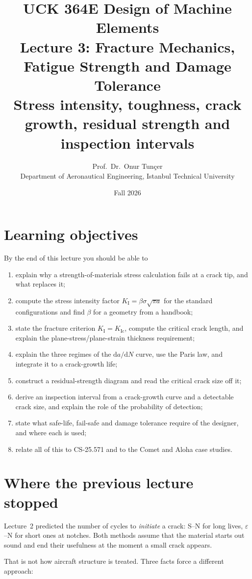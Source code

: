 \documentclass[11pt,a4paper]{article}
\title{\textbf{UCK 364E Design of Machine Elements}\\[4pt]
\Large Lecture 3: Fracture Mechanics, Fatigue Strength and Damage Tolerance\\[2pt]
\large Stress intensity, toughness, crack growth, residual strength and inspection intervals}
\author{Prof.\ Dr.\ Onur Tunçer\\ Department of Aeronautical Engineering, Istanbul Technical University}
\date{Fall 2026}
\begin{document}
\maketitle

\section*{Learning objectives}
By the end of this lecture you should be able to
\begin{enumerate}[nosep]
  \item explain why a strength-of-materials stress calculation fails at a crack tip, and what replaces it;
  \item compute the stress intensity factor $K_{\mathrm{I}}=\beta\sigma\sqrt{\pi a}$ for the standard configurations and find $\beta$ for a geometry from a handbook;
  \item state the fracture criterion $K_{\mathrm{I}}=K_{\mathrm{Ic}}$, compute the critical crack length, and explain the plane-stress/plane-strain thickness requirement;
  \item explain the three regimes of the $\mathrm{d}a/\mathrm{d}N$ curve, use the Paris law, and integrate it to a crack-growth life;
  \item construct a residual-strength diagram and read the critical crack size off it;
  \item derive an inspection interval from a crack-growth curve and a detectable crack size, and explain the role of the probability of detection;
  \item state what safe-life, fail-safe and damage tolerance require of the designer, and where each is used;
  \item relate all of this to CS-25.571 and to the Comet and Aloha case studies.
\end{enumerate}

\section{Where the previous lecture stopped}

Lecture~2 predicted the number of cycles to \emph{initiate} a crack: S--N for long lives, $\varepsilon$--N for short ones at notches. Both methods assume that the material starts out sound and end their usefulness at the moment a small crack appears.

That is not how aircraft structure is treated. Three facts force a different approach:
\end{document}
